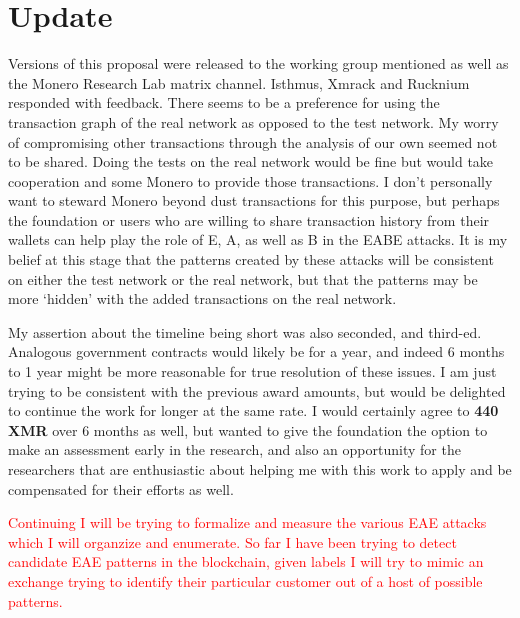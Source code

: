 \documentclass[prc, 12pt]{revtex4-1}
\begin{document}
\section{Update}
Versions of this proposal were released to the working group mentioned as well as the Monero Research Lab matrix channel.  Isthmus, Xmrack and Rucknium responded with feedback.  There seems to be a preference for using the transaction graph of the real network as opposed to the test network.  My worry of compromising other transactions through the analysis of our own seemed not to be shared.  Doing the tests on the real network would be fine but would take cooperation and some Monero to provide those transactions.  I don't personally want to steward Monero beyond dust transactions for this purpose, but perhaps the foundation or users who are willing to share transaction history from their wallets can help play the role of E, A, as well as B in the EABE attacks.  It is my belief at this stage that the patterns created by these attacks will be consistent on either the test network or the real network, but that the patterns may be more `hidden' with the added transactions on the real network.  

My assertion about the timeline being short was also seconded, and third-ed.  Analogous government contracts would likely be for a year, and indeed 6 months to 1 year might be more reasonable for true resolution of these issues.  I am just trying to be consistent with the previous award amounts, but would be delighted to continue the work for longer at the same rate.  I would certainly agree to \textbf{440 XMR} over 6 months as well, but wanted to give the foundation the option to make an assessment early in the research, and also an opportunity for the researchers that are enthusiastic about helping me with this work to apply and be compensated for their efforts as well. 

\textcolor{red}{Continuing I will be trying to formalize and measure the various EAE attacks which I will organzize and enumerate.  So far I have been trying to detect candidate EAE patterns in the blockchain, given labels I will try to mimic an exchange trying to identify their particular customer out of a host of possible patterns.}
  


\end{document}
